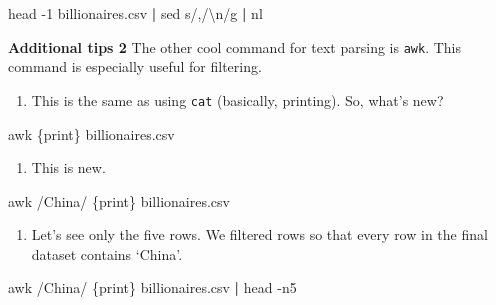 \documentclass[
]{book}
\newenvironment{Shaded}{\begin{snugshade}}{\end{snugshade}}
\newcommand{\AttributeTok}[1]{\textcolor[rgb]{0.77,0.63,0.00}{#1}}
\newcommand{\FunctionTok}[1]{\textcolor[rgb]{0.00,0.00,0.00}{#1}}
\newcommand{\KeywordTok}[1]{\textcolor[rgb]{0.13,0.29,0.53}{\textbf{#1}}}
\newcommand{\NormalTok}[1]{#1}
\newcommand{\StringTok}[1]{\textcolor[rgb]{0.31,0.60,0.02}{#1}}
\providecommand{\tightlist}{%
  \setlength{\itemsep}{0pt}\setlength{\parskip}{0pt}}
\begin{document}
\begin{Shaded}
\begin{Highlighting}[]
\FunctionTok{head} \AttributeTok{{-}1}\NormalTok{ billionaires.csv }\KeywordTok{|} \FunctionTok{sed} \StringTok{\textquotesingle{}s/,/\textbackslash{}n/g\textquotesingle{}} \KeywordTok{|} \FunctionTok{nl}
\end{Highlighting}
\end{Shaded}

\textbf{Additional tips 2}
The other cool command for text parsing is \texttt{awk}. This command is especially useful for filtering.

\begin{enumerate}
\def\labelenumi{\arabic{enumi}.}
\tightlist
\item
  This is the same as using \texttt{cat} (basically, printing). So, what's new?
\end{enumerate}

\begin{Shaded}
\begin{Highlighting}[]
\FunctionTok{awk} \StringTok{\textquotesingle{}\{print\}\textquotesingle{}}\NormalTok{ billionaires.csv }
\end{Highlighting}
\end{Shaded}

\begin{enumerate}
\def\labelenumi{\arabic{enumi}.}
\setcounter{enumi}{1}
\tightlist
\item
  This is new.
\end{enumerate}

\begin{Shaded}
\begin{Highlighting}[]
\FunctionTok{awk} \StringTok{\textquotesingle{}/China/ \{print\}\textquotesingle{}}\NormalTok{ billionaires.csv}
\end{Highlighting}
\end{Shaded}

\begin{enumerate}
\def\labelenumi{\arabic{enumi}.}
\setcounter{enumi}{2}
\tightlist
\item
  Let's see only the five rows. We filtered rows so that every row in the final dataset contains `China'.
\end{enumerate}

\begin{Shaded}
\begin{Highlighting}[]
\FunctionTok{awk} \StringTok{\textquotesingle{}/China/ \{print\}\textquotesingle{}}\NormalTok{ billionaires.csv }\KeywordTok{|} \FunctionTok{head} \AttributeTok{{-}n5} 
\end{Highlighting}
\end{Shaded}
\end{document}
